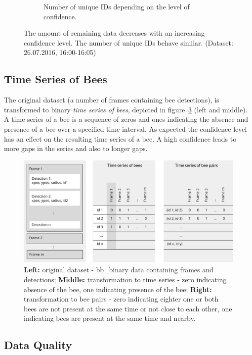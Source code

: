 \begin{figure}
\begin{subfigure}[b]{0.45\textwidth}
        \caption[Unique IDs]{Number of unique IDs depending on the level of confidence.}
        \label{fig:confVSids}
    \end{subfigure}
    \caption[Amount of Remaining Data]{The amount of remaining data decreases with an increasing confidence level. The number of unique IDs behave similar. (Dataset: 26.07.2016, 16:00-16:05)}
    \label{fig:confidence}
\end{figure}

\subsection{Time Series of Bees}
\label{subsec:tracking}

The original dataset (a number of frames containing bee detections), is transformed to binary \emph{time series of bees}, depicted in figure~\ref{fig:structure} (left and middle). A time series of a bee is a sequence of zeros and ones indicating the absence and presence of a bee over a specified time interval. 
As expected the confidence level has an effect on the resulting time series of a bee. A high confidence leads to more gaps in the series and also to longer gaps.

\begin{figure}[htb]
	\centering
	\includegraphics[width=1.0\textwidth]{Figures/structure}
	\caption[Structure of Dataset]{\textbf{Left:} original dataset - bb\_binary data containing frames and detections; \textbf{Middle:} transformation to time series - zero indicating absence of the bee, one indicating presence of the bee; \textbf{Right:} transformation to bee pairs - zero indicating eighter one or both bees are not present at the same time or not close to each other, one indicating bees are present at the same time and nearby.}
	\label{fig:structure}
\end{figure}


\subsection{Data Quality}
\label{subsec:quality}

